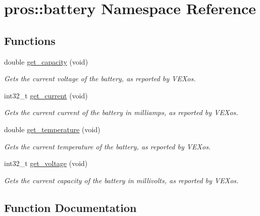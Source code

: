 \hypertarget{namespacepros_1_1battery}{}\section{pros\+:\+:battery Namespace Reference}
\label{namespacepros_1_1battery}
\subsection*{Functions}
\begin{DoxyCompactItemize}
\item 
double \hyperlink{namespacepros_1_1battery_a42876357c2ed5a047a535aca84f4458e}{get\+\_\+capacity} (void)
\begin{DoxyCompactList}\small\item\em Gets the current voltage of the battery, as reported by V\+E\+Xos. \end{DoxyCompactList}\item 
int32\+\_\+t \hyperlink{namespacepros_1_1battery_ad0f092e6341126d68ae15d41b5dba352}{get\+\_\+current} (void)
\begin{DoxyCompactList}\small\item\em Gets the current current of the battery in milliamps, as reported by V\+E\+Xos. \end{DoxyCompactList}\item 
double \hyperlink{namespacepros_1_1battery_a33d1a503808ed06148a1884e3ccf88ae}{get\+\_\+temperature} (void)
\begin{DoxyCompactList}\small\item\em Gets the current temperature of the battery, as reported by V\+E\+Xos. \end{DoxyCompactList}\item 
int32\+\_\+t \hyperlink{namespacepros_1_1battery_a2c325b346f66c15ca7e5a844a66b20d9}{get\+\_\+voltage} (void)
\begin{DoxyCompactList}\small\item\em Gets the current capacity of the battery in millivolts, as reported by V\+E\+Xos. \end{DoxyCompactList}\end{DoxyCompactItemize}


\subsection{Function Documentation}
\mbox{\label{namespacepros_1_1battery_a42876357c2ed5a047a535aca84f4458e}} 
